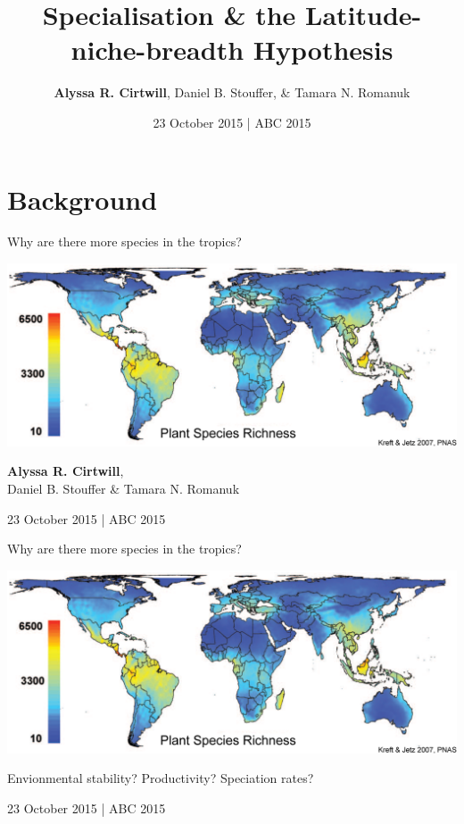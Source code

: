 \documentclass{beamer}
\title[Specialisation \& the Latitude-niche-breadth Hypothesis]
{Specialisation \& the Latitude-niche-breadth Hypothesis}
\author[A.R. Cirtwill, D.B. Stouffer, \& T.N. Romanuk]{\textbf{Alyssa R. Cirtwill}, Daniel B. Stouffer, \& Tamara N. Romanuk}
\institute[]
{
  Stouffer Lab\\
  School of Biological Sciences\\
  University of Canterbury\\
  Christchurch, New Zealand\\
  ~\\
  www.stoufferlab.org\\
}
\date[Short Occasion] 
{23 October 2015 | ABC 2015}
\begin{document}

\section*{Background}

  \begin{frame}{Why are there more species in the tropics?}

    \begin{center}
      \includegraphics*[width=.8\textwidth]{Figures/plant_richness.eps}

      \vspace{1cm}

    \textbf{Alyssa R. Cirtwill},\\ Daniel B. Stouffer \& Tamara N. Romanuk

    \vspace{1cm}

    23 October 2015 | ABC 2015

    \end{center}
  \end{frame}


  \begin{frame}{Why are there more species in the tropics?}

    \begin{center}
      \includegraphics*[width=.8\textwidth]{Figures/plant_richness.eps}

      \vspace{.5cm}

      {\color{white}{\Large Latitude-Niche Breadth Hypothesis}}

      \vspace{.5cm}

      Envionmental stability? 
      Productivity? 
      Speciation rates?

      \vspace{1cm}

      {\color{white}23 October 2015 | ABC 2015}

    \end{center}
  \end{frame}
\end{document}
